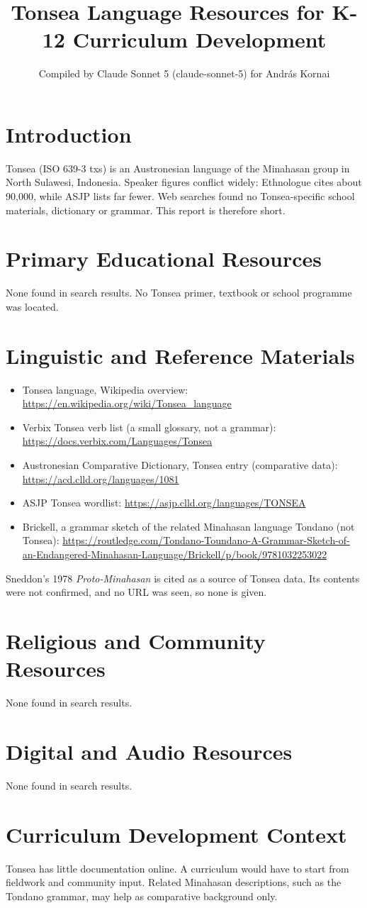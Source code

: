 \documentclass[12pt]{article}
\title{Tonsea Language Resources for K-12 Curriculum Development}
\author{Compiled by Claude Sonnet 5 (claude-sonnet-5) for Andr\'as Kornai}
\date{}
\begin{document}
\maketitle
\section{Introduction}
Tonsea (ISO 639-3 txs) is an Austronesian language of the Minahasan group in North Sulawesi, Indonesia. Speaker figures conflict widely: Ethnologue cites about 90,000, while ASJP lists far fewer. Web searches found no Tonsea-specific school materials, dictionary or grammar. This report is therefore short.
\section{Primary Educational Resources}
None found in search results. No Tonsea primer, textbook or school programme was located.
\section{Linguistic and Reference Materials}
\begin{itemize}
\item Tonsea language, Wikipedia overview: \url{https://en.wikipedia.org/wiki/Tonsea_language}
\item Verbix Tonsea verb list (a small glossary, not a grammar): \url{https://docs.verbix.com/Languages/Tonsea}
\item Austronesian Comparative Dictionary, Tonsea entry (comparative data): \url{https://acd.clld.org/languages/1081}
\item ASJP Tonsea wordlist: \url{https://asjp.clld.org/languages/TONSEA}
\item Brickell, a grammar sketch of the related Minahasan language Tondano (not Tonsea): \url{https://routledge.com/Tondano-Toundano-A-Grammar-Sketch-of-an-Endangered-Minahasan-Language/Brickell/p/book/9781032253022}
\end{itemize}
Sneddon's 1978 \emph{Proto-Minahasan} is cited as a source of Tonsea data. Its contents were not confirmed, and no URL was seen, so none is given.
\section{Religious and Community Resources}
None found in search results.
\section{Digital and Audio Resources}
None found in search results.
\section{Curriculum Development Context}
Tonsea has little documentation online. A curriculum would have to start from fieldwork and community input. Related Minahasan descriptions, such as the Tondano grammar, may help as comparative background only.
\end{document}
